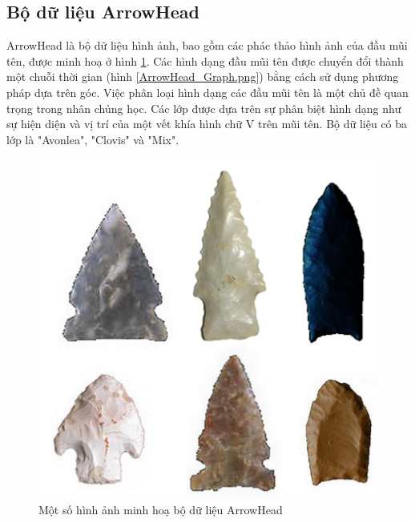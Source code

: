 \documentclass[13pt,oneside]{scrbook}
\begin{document}
\subsection{Bộ dữ liệu ArrowHead}
ArrowHead là bộ dữ liệu hình ảnh, bao gồm các phác thảo hình ảnh của đầu mũi tên, được minh hoạ ở hình \ref{ArrowHead.png}. 
Các hình dạng đầu mũi tên được chuyển đổi thành một chuỗi thời gian (hình \ref{ArrowHead_Graph.png}) bằng cách sử dụng phương pháp dựa trên góc. 
Việc phân loại hình dạng các đầu mũi tên là một chủ đề quan trọng trong nhân chủng học. 
Các lớp được dựa trên sự phân biệt hình dạng như sự hiện diện và vị trí của một vết khía hình chữ V trên mũi tên. Bộ dữ liệu có ba lớp là "Avonlea", "Clovis" và "Mix".
\begin{figure}[H]
	\begin{center}
		\includegraphics[width=130mm]{ArrowHead.png}
		\caption{Một số hình ảnh minh hoạ bộ dữ liệu ArrowHead} 
		\label{ArrowHead.png}
	\end{center}
\end{figure}
\end{document}
